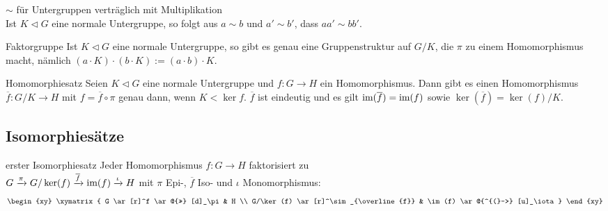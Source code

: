\linie

\begin{Lemma}{$\sim$ für Untergruppen verträglich mit Multiplikation}\\
    Ist $K \vartriangleleft G$ eine normale Untergruppe, so folgt aus
    $a \sim b$ und $a' \sim b'$, dass $aa' \sim bb'$.
\end{Lemma}

\begin{Satz}{Faktorgruppe}
    Ist $K \vartriangleleft G$ eine normale Untergruppe, so gibt es genau
    eine Gruppenstruktur auf $G/K$, die $\pi$ zu einem Homomorphismus macht,
    nämlich $(a \cdot K) \cdot (b \cdot K) := (a \cdot b) \cdot K$.
\end{Satz}

\linie

\begin{Satz}{Homomorphiesatz}
    Seien $K \vartriangleleft G$ eine normale Untergruppe und
    $f\colon G \rightarrow H$ ein Homomorphismus.
    Dann gibt es einen Homomorphismus $\overline{f}\colon G/K \rightarrow H$
    mit $f = \overline{f} \circ \pi$ genau dann, wenn $K < \ker f$.
    $\overline{f}$ ist eindeutig und es gilt $\text{im}(\overline{f}) = \text{im}(f)$
    sowie $\ker(\overline{f}) = \ker(f) / K$.
\end{Satz}

\pagebreak

\subsection{%
    Isomorphiesätze%
}

\begin{Satz}{erster Isomorphiesatz}
    Jeder Homomorphismus $f\colon G \rightarrow H$ faktorisiert zu \\
    $G \xrightarrow{\pi} G/\ker(f) \xrightarrow{\overline{f}} \text{im}(f)
    \xrightarrow{\iota} H$
    mit $\pi$ Epi-, $\overline{f}$ Iso- und $\iota$ Monomorphismus:
    \displaymathother
    \begin{align*}
        \begin{xy}
            \xymatrix{
                G \ar[r]^f \ar @{>>} [d]_\pi &
                H \\
                G/\ker(f) \ar[r]^\sim_{\overline{f}} &
                \im(f) \ar @{^{(}->} [u]_\iota
            }
        \end{xy}
    \end{align*}
    \displaymathnormal
\end{Satz}


